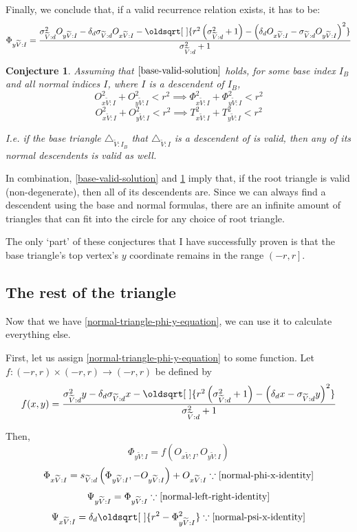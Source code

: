 \documentclass[a4paper,12pt]{article}
\newcommand{\HSview}[1][V]{\widetilde{#1}}
\newcommand{\HStriangle}[1][I]{\triangle_{\HSview:#1}}
\newcommand{\HSTx}[1][I]{T_{x\HSview:#1}}
\newcommand{\HSTy}[1][I]{T_{y\HSview:#1}}
\newcommand{\HSPSIx}[1][I]{\Psi_{x\HSview:#1}}
\newcommand{\HSPSIy}[1][I]{\Psi_{y\HSview:#1}}
\newcommand{\HSPHIx}[1][I]{\Phi_{x\HSview:#1}}
\newcommand{\HSPHIy}[1][I]{\Phi_{y\HSview:#1}}
\newcommand{\HSOx}[1][I]{O_{x\HSview:#1}}
\newcommand{\HSOy}[1][I]{O_{y\HSview:#1}}
\newcommand{\HSdelta}[1][d]{\delta_{#1}}
\newcommand{\HSs}[1][d]{s_{\HSview:#1}}
\newcommand{\HSsigma}[1][d]{\sigma_{\HSview:#1}}
\renewcommand*{\sqrt}[2][\ ]{\oldsqrt[#1]{#2} }
\newtheorem{conjecture}[theorem]{Conjecture}
\theoremstyle{definition}
\theoremstyle{plain}
\begin{document}
	Finally, we conclude that, if a valid recurrence relation exists, it has to be:
  \begin{equation}
  	\HSPHIy = \frac{\HSsigma^2\HSOy - \HSdelta\HSsigma\HSOx - \sqrt{r^2\left(\HSsigma^2 + 1\right) - \left(\HSdelta \HSOx - \HSsigma \HSOy\right)^2}}{\HSsigma^2 + 1} \label{normal-triangle-phi-y-equation}
  \end{equation}
	
	\begin{conjecture} \label{normal-valid-solution}
		Assuming that $\ref{base-valid-solution}$ holds,
		for some base index $I_B$ and all normal indices $I$, where $I$ is a descendent of $I_B$,
		$$\HSOx^2 + \HSOy^2 < r^2 \implies \HSPHIx^2 + \HSPHIy^2 < r^2$$
		$$\HSOx^2 + \HSOy^2 < r^2 \implies \HSTx^2 + \HSTy^2 < r^2$$

		I.e. if the base triangle $\HStriangle[I_B]$ that $\HStriangle$ is a descendent of is valid,
		then any of its normal descendents is valid as well.
	\end{conjecture}

	In combination, \ref{base-valid-solution} and \ref{normal-valid-solution} imply that, if the root triangle is valid (non-degenerate), then all of its descendents are. Since we can always find a descendent using the base and normal formulas, there are an infinite amount of triangles that can fit into the circle for any choice of root triangle.

	The only `part' of these conjectures that I have successfully proven is that the base triangle's top vertex's $y$ coordinate remains
	in the range $\left(-r, r\right]$.
	
	\newpage


	\subsection{The rest of the triangle}
	Now that we have \eqref{normal-triangle-phi-y-equation}, we can use it to calculate everything else.

	First, let us assign \eqref{normal-triangle-phi-y-equation} to some function.
	Let $f : \left(-r, r\right) \times \left(-r, r\right) \to \left(-r, r\right)$ be defined by
  $$
  f(x, y) =
  \frac{\HSsigma^2y - \HSdelta\HSsigma x - \sqrt{r^2\left(\HSsigma^2 + 1\right) - \left(\HSdelta x - \HSsigma y\right)^2}}{\HSsigma^2 + 1}
  $$

	Then,
	$$\HSPHIy = f\left(\HSOx, \HSOy\right)$$
	$$\HSPHIx = \HSs\left(\HSPHIy, - \HSOy\right) + \HSOx \because \eqref{normal-phi-x-identity}$$
	$$\HSPSIy = \HSPHIy \because \eqref{normal-left-right-identity}$$
	$$\HSPSIx = \HSdelta \sqrt{r^2 - \HSPHIy^2} \because \eqref{normal-psi-x-identity}$$
\end{document}
